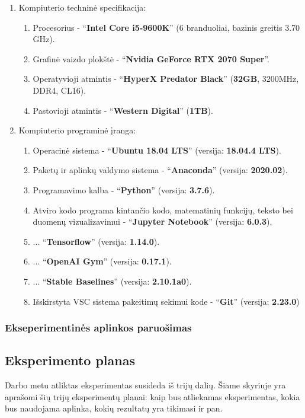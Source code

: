 \documentclass{VUMIFPSbakalaurinis}
\begin{document}
\begin{enumerate}
	\item Kompiuterio techninė specifikacija:
	\begin{enumerate}
		\item Procesorius - \enquote{\textbf{Intel Core i5-9600K}} (6 branduoliai, bazinis greitis 3.70 GHz).
		\item Grafinė vaizdo plokštė - \enquote{\textbf{Nvidia GeForce RTX 2070 Super}}.
		\item Operatyvioji atmintis - \enquote{\textbf{HyperX Predator Black}} (\textbf{32GB}, 3200MHz, DDR4, CL16).
		\item Pastovioji atmintis - \enquote{\textbf{Western Digital}} (\textbf{1TB}).
	\end{enumerate}

	\item Kompiuterio programinė įranga:
	\begin{enumerate}
		\item Operacinė sistema - \enquote{\textbf{Ubuntu 18.04 LTS}} (versija: \textbf{18.04.4 LTS}).
		\item Paketų ir aplinkų valdymo sistema - \enquote{\textbf{Anaconda}}  (versija: \textbf{2020.02}).
		\item Programavimo kalba - \enquote{\textbf{Python}} (versija: \textbf{3.7.6}).
		\item Atviro kodo programa kintančio kodo, matematinių funkcijų, teksto bei duomenų vizualizavimui - \enquote{\textbf{Jupyter Notebook}}  (versija: \textbf{6.0.3}).
		\item ... \enquote{\textbf{Tensorflow}} (versija: \textbf{1.14.0}).
		\item ... \enquote{\textbf{OpenAI Gym}} (versija: \textbf{0.17.1}).
		\item ... \enquote{\textbf{Stable Baselines}} (versija: \textbf{2.10.1a0}).
		\item Išskirstyta VSC sistema pakeitimų sekimui kode - \enquote{\textbf{Git}} (versija: \textbf{2.23.0}) 
	\end{enumerate}
\end{enumerate}

\subsubsection{Ekseperimentinės aplinkos paruošimas}

\subsection{Eksperimento planas}
Darbo metu atliktas eksperimentas susideda iš trijų dalių. Šiame skyriuje yra aprašomi šių trijų eksperimentų planai: kaip bus atliekamas eksperimentas, kokia bus naudojama aplinka, kokių rezultatų yra tikimasi ir pan.
\end{document}
